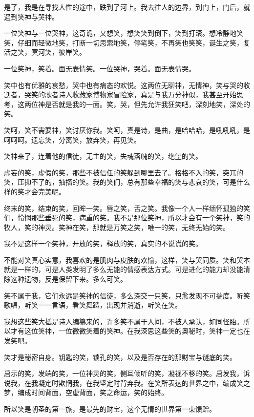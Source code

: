 \documentclass[UTF8]{article}
\begin{document}
\par 是了，我是在寻找人性的途中，跌到了河上。我去往人的边界，到门上，门后，就遇到笑神与哭神。
\par 一位笑神与一位哭神，这奇诡，又想笑，想笑笑到倒下，笑到打滚。想冷静地笑笑，仔细而轻微地笑，打断一切思索地笑，停笔笑，不再笑也笑笑，诞生之笑，复活之笑，冥河笑，彼岸笑。
\par 一位笑神，笑着。面无表情笑。一位哭神，哭着。面无表情哭。
\par 笑中也有优雅的哀愁，哭中也有病态的欢悦。这两位无聊神，无情神，笑与哭的收割者，哭笑的歌者诗人收藏家博物家冒险家，真是与我万分神似，我甚至开始思考，这两位神是否就是我的一面。笑，哭，但先允许我狂笑吧，深刻地笑，深处的笑。
\par 笑呵，笑不需要神，笑讨厌你我。笑呵，真是诗，是曲，是哈哈哈，是吼吼吼，是呵呵呵。遗忘笑，分离笑，放弃笑，再见笑。
\par 笑神来了，连着他的信徒，无主的笑，失魂落魄的笑，绝望的笑。
\\[0.6cm]
\par 虚妄的笑，虚假的笑，那些不被信任的笑躲到哪里去了。格格不入的笑，突兀的笑，压抑不了的，抽搐的笑。我的笑们，总有那些幸福的笑与悲哀的笑，可是什么样的笑才会完美呢。
\par 终末的笑，结束的笑，回眸一笑。唇之笑，舌之笑。我像一个人一样缅怀孤独的笑们，怜悯那些垂死的笑，病重的笑。我不是那位笑神，所以才会有一个笑神，笑的牧人，笑的神灵。笑神在笑，那就是万笑之笑，唯一的笑，无终无始的笑。
\par 我不是这样一个笑神，开放的笑，释放的笑，真实的不说谎的笑。
\par 不能对笑真心实意，我喜欢的是肌肉与皮肤的欢愉，这样，笑与哭同质。笑和哭本就是一样的，可是人类发明了多么无能的情感表达方式。可是进化的能力却没能清除这种遗物，反是保留下来。多么可笑。
\par 笑不属于我，它们永远是笑神的信徒，多么深交一只笑，只愈发现不可揣度。听笑歌唱，听笑一一言语，看笑舞蹈，出现并消逝，听笑在笑。
\par 我想这些笑大抵是诗人编纂来的，许多笑不属于人间，不被人承认，如同怪胎。所以才有这位笑神，一位微微笑着的笑神。在我深思这些笑的奥秘时，笑神一定也在发笑吧。
\par 笑才是秘密自身。钥匙的笑，锁孔的笑，以及是否存在的那财宝与谜底的笑。
\par 启示的笑，发端的笑，一位神灵的笑，侧耳倾听的笑，凝视不移的笑。启发我，诉说我，在我凝定时欺惘我，在我坚定时背弃我。在笑所表达的世界之中，编成笑之梦，编成时间背面，空虚背面，笑之命运，笑的始终。
\par 所以笑是朝圣的第一旅，是最先的财宝，这个无情的世界第一束馈赠。
\end{document}
